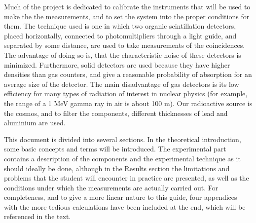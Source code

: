 Much of the project is dedicated to calibrate the instruments that will be used to make the the measurements, and to set the system into the proper conditions for them. The technique used is one in which two organic scintillation detectors,  placed horizontally, connected to photomultipliers through a light guide, and separated by some distance, are used to take measurements of the coincidences. The advantage of doing so is, that the characteristic noise of these detectors is minimized. Furthermore, solid detectors are used because they have higher densities than gas counters, and give a reasonable probability of absorption for an average size of the detector. The main disadvantage of gas detectors is its low efficiency for many types of radiation of interest in nuclear physics (for example, the range of a 1 MeV gamma ray in air is about 100 m). Our radioactive source is the cosmos, and to filter the components, different thicknesses of lead and aluminium are used.


	This document is divided into several sections. In the theoretical introduction, some basic concepts and terms will be introduced. The experimental part contains a description of the components and the experimental technique as it should ideally be done, although in the Results section the limitations and problems that the student will encounter in practice are presented, as well as the conditions under which the measurements are actually carried out. For completeness, and to give a more linear nature to this guide, four appendices with the more tedious calculations have been included at the end, which will be referenced in the text.


